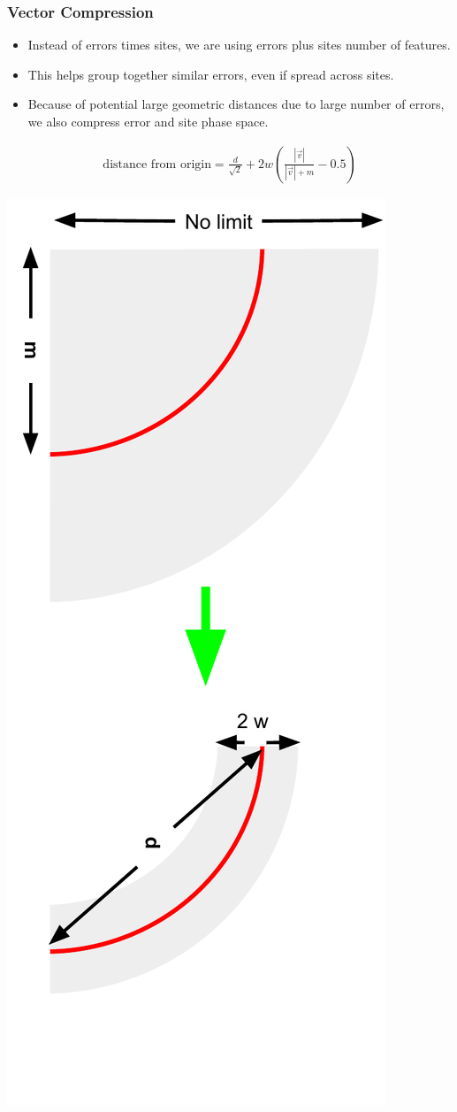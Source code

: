\documentclass{beamer}
\begin{document}
\begin{frame}
  \frametitle{Vector Compression}

  \begin{itemize}
  \item Instead of errors times sites, we are using errors plus sites number of features.
  \item This helps group together similar errors,
    even if spread across sites.
  \item Because of potential large geometric distances due to large number of errors,
    we also compress error and site phase space.
  \end{itemize}

  \begin{gather}
  \text{distance from origin} = \frac{d}{\sqrt{2}} +
      2 w \left(\frac{|\vec{v}|}{|\vec{v}| + m} - 0.5\right)
  \end{gather}

  \hspace{0.2\linewidth}
  \includegraphics[height=0.6\linewidth, angle=90]{compress.pdf}

\end{frame}
\end{document}
